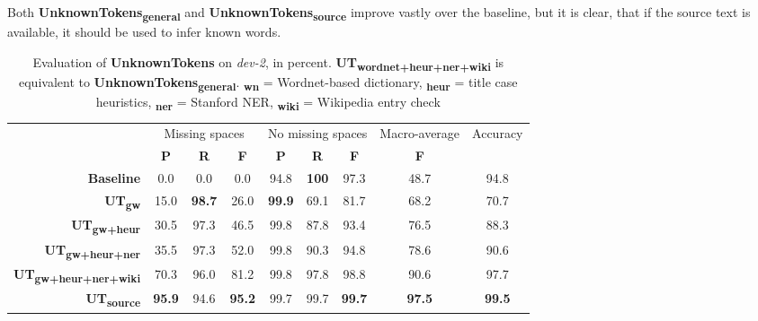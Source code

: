 \documentclass[a4paper,10pt]{scrartcl}
\theoremstyle{style}
\begin{document}
Both \textbf{UnknownTokens\textsubscript{general}} and \textbf{UnknownTokens\textsubscript{source}} improve vastly over the baseline, but it is clear, that if the source text is available, it should be used to infer known words.


\begin{table}
\begin{center}
\begin{tabular}{r|c|c|c|c|c|c|c|c|}
& \multicolumn{3}{c|}{Missing spaces} & \multicolumn{3}{c|}{No missing spaces} & Macro-average & Accuracy\\
& \textbf{P} & \textbf{R} & \textbf{F} & \textbf{P} & \textbf{R} & \textbf{F} & \textbf{F} & \\
\hline
\textbf{Baseline} & 0.0 & 0.0 & 0.0 & 94.8 & \textbf{100} & 97.3 & 48.7 & 94.8\\
\hline
\textbf{UT\textsubscript{gw}} & 15.0 & \textbf{98.7} & 26.0 & \textbf{99.9} & 69.1 & 81.7 & 68.2 & 70.7\\
\hline
\textbf{UT\textsubscript{gw+heur}} & 30.5 & 97.3 & 46.5 & 99.8 & 87.8 & 93.4 & 76.5 & 88.3\\
\hline
\textbf{UT\textsubscript{gw+heur+ner}} & 35.5 & 97.3 & 52.0 & 99.8 & 90.3 & 94.8 & 78.6 & 90.6\\
\hline
\textbf{UT\textsubscript{gw+heur+ner+wiki}} & 70.3 & 96.0 & 81.2 & 99.8 & 97.8 & 98.8 & 90.6 & 97.7\\
\hline
\textbf{UT\textsubscript{source}} & \textbf{95.9} & 94.6 & \textbf{95.2} & 99.7 & 99.7 & \textbf{99.7} & \textbf{97.5} & \textbf{99.5}\\
\end{tabular}
\end{center}
\caption{Evaluation of \textbf{UnknownTokens} on \textit{dev-2}, in percent. \textbf{UT\textsubscript{wordnet+heur+ner+wiki}} is equivalent to \textbf{UnknownTokens\textsubscript{general}}. \textbf{\textsubscript{wn}} = Wordnet-based dictionary, \textbf{\textsubscript{heur}} = title case heuristics, \textbf{\textsubscript{ner}} = Stanford NER, \textbf{\textsubscript{wiki}} = Wikipedia entry check}
\label{eval_unknowntokens}
\end{table}
\end{document}

